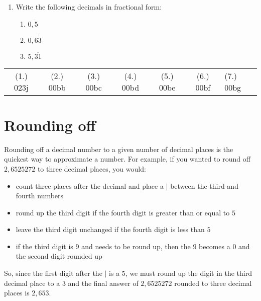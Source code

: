 \begin{exercises}{}
{\begin{enumerate}[itemsep=5pt, label=\textbf{\arabic*}. ]
\begin{enumerate}[itemsep=5pt, label=\textbf{(\alph*)} ]
    \item $4\dfrac{5}{6}$
    \item $2\dfrac{1}{9}$
    \end{enumerate}
\item Write the following decimals in fractional form:
    \begin{enumerate}[itemsep=3pt, label=\textbf{(\alph*)} ] 
    \item $0,\dot{5}$
    \item $0,6\dot{3}$
    \item $5,\overline{31}$
    \end{enumerate}
\end{enumerate}
\practiceinfo 
\par 
 \par \begin{tabular}[h]{cccccc}
 (1.) 023j & (2.) 00bb&  (3.) 00bc&  (4.) 00bd& (5.) 00be& (6.) 00bf& (7.) 00bg\end{tabular}
}
\end{exercises}

\section{Rounding off}
\nopagebreak
Rounding off a decimal number to a given number of decimal places is
the quickest way to approximate a number. For example, if you wanted
to round off $2,6525272$ to three decimal places, you would:
\begin{itemize}
\item count three places after the decimal and place a $|$ between the third and fourth numbers
\item round up the third digit if the fourth digit is greater than or equal to $5$
\item leave the third digit unchanged if the fourth digit is less than $5$
\item if the third digit is $9$ and needs to be round up, then the $9$ becomes a $0$ and the second digit rounded up
\end{itemize}
\par 
So, since the first digit after the $|$ is a $5$, we must round up the digit in the third decimal place to a $3$ and the final answer of $2,6525272$ rounded to three decimal places is $2,653$.
\par


